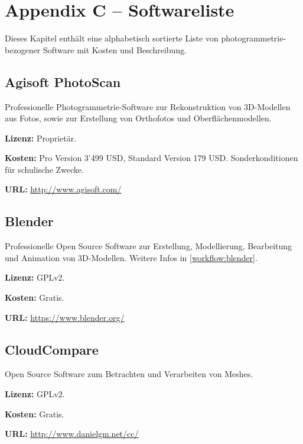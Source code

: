 \chapter{Appendix C -- Softwareliste}

\label{ch:software}

{

\setlength{\parindent}{0em}
\setlength{\parskip}{0.8em}

Dieses Kapitel enthält eine alphabetisch sortierte Liste von
photogrammetrie-bezogener Software mit Kosten und Beschreibung.


\section{Agisoft PhotoScan}

Professionelle Photogrammetrie-Software zur Rekonstruktion von 3D-Modellen aus
Fotos, sowie zur Erstellung von Orthofotos und Oberflächenmodellen.

\textbf{Lizenz:} Proprietär.

\textbf{Kosten:} Pro Version 3'499 USD, Standard Version 179 USD.
Sonderkonditionen für schulische Zwecke.

\textbf{URL:} \url{http://www.agisoft.com/}


\section{Blender}

Professionelle Open Source Software zur Erstellung, Modellierung, Bearbeitung
und Animation von 3D-Modellen. Weitere Infos in \autoref{workflow:blender}.

\textbf{Lizenz:} GPLv2.

\textbf{Kosten:} Gratis.

\textbf{URL:} \url{https://www.blender.org/}


\section{CloudCompare}

Open Source Software zum Betrachten und Verarbeiten von Meshes.

\textbf{Lizenz:} GPLv2.

\textbf{Kosten:} Gratis.

\textbf{URL:} \url{http://www.danielgm.net/cc/}

}
